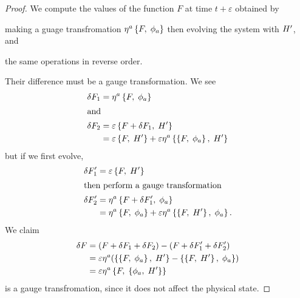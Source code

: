 \begin{proof}
We compute the values of the function $F$ at time $t+\varepsilon$
obtained by
\begin{enumerate*}[label=(\em\roman*\/\upshape)]
\item making a guage transfromation
  $\eta^{a}\left\{F,\;\phi_{a}\right\}$ then evolving the system with
  $H'$, and
\item the same operations in reverse order.
\end{enumerate*}
Their difference must be a gauge transformation. We see 
\begin{subequations}
\begin{align}
\delta F_{1} &= \eta^{a}\left\{F,\;\phi_{a}\right\}\\
\intertext{and}
\delta F_{2} &= \varepsilon\left\{F+\delta F_{1},\;H'\right\}\\
&=\varepsilon\left\{F,\;H'\right\} + \varepsilon\eta^{a}\left\{\left\{F,\;\phi_{a}\right\},\;H'\right\}
\end{align}
\end{subequations}
but if we first evolve, 
\begin{subequations}
\begin{align}
\delta F_{1}' &= \varepsilon\left\{F,\;H'\right\}\\
\intertext{then perform a gauge transformation}
\delta F_{2}' &= \eta^{a}\left\{F+\delta F_{1}',\;\phi_{a}\right\}\\
&= \eta^{a}\left\{F,\;\phi_{a}\right\}+\varepsilon\eta^{a}\left\{\left\{F,\;H'\right\},\;\phi_{a}\right\}.
\end{align}
\end{subequations}
We claim
\begin{subequations}
\begin{align}
\delta F &= (F+\delta F_{1}+\delta F_{2}) - (F + \delta F_{1}' + \delta F_{2}')\\
&= \varepsilon\eta^{a}(\left\{\left\{F,\;\phi_{a}\right\},\;H'\right\}
-\left\{\left\{F,\;H'\right\},\;\phi_{a}\right\})\\
&= \varepsilon\eta^{a}\left\{F,\;\left\{\phi_{a},\;H'\right\}\right\}
\end{align}
\end{subequations}
is a gauge transfromation, since it does not affect the physical state.
\end{proof}

